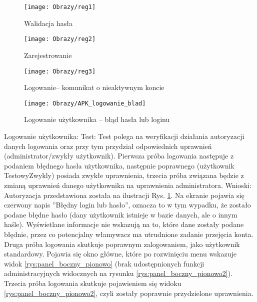\documentclass[twoside,10pt]{article}
\begin{document}
\begin{enumerate*}
\begin{figure}[ht!]
\centering
\begin{minipage}{0.3\textwidth}
\texttt{[image: Obrazy/reg1]}
\caption{Walidacja hasła }
\label{rys:reg1}
\end{minipage}
\hspace{0.05\textwidth}
\begin{minipage}{0.3\textwidth}
\texttt{[image: Obrazy/reg2]}
\caption{Zarejestrowanie}
\label{rys:reg2}
\end{minipage}
\hspace{0.05\textwidth}
\begin{minipage}{0.3\textwidth}
\texttt{[image: Obrazy/reg3]}
\caption{Logowanie-- komunikat o nieaktywnym koncie}
\label{rys:reg3}
\end{minipage}
\hspace{0.05\textwidth}
\begin{minipage}{0.3\textwidth}
\texttt{[image: Obrazy/APK\_logowanie\_blad]}
\caption{Logowanie użytkownika -- błąd hasła lub loginu}
\label{rys:Logodwanie_blad_hasla}
\end{minipage}
\end{figure}
\newpage
\item Logowanie użytkownika: \newline
Test: Test polega na weryfikacji działania autoryzacji danych logowania oraz przy tym przydział odpowiednich uprawnień (administrator/zwykły użytkownik). Pierwsza próba logowania następuje z podaniem błędnego hasła użytkownika, następnie poprawnego (użytkownik TestowyZwykly) posiada zwykłe uprawnienia, trzecia próba związana będzie z zmianą uprawnień danego użytkownika na uprawnienia administratora.\newline
Wnioski: Autoryzacja przedstawiona została na ilustracji Rys. \ref{rys:Logodwanie_blad_hasla}. Na ekranie pojawia się czerwony napis ''Błędny login lub hasło'', oznacza to w tym wypadku, że zostało podane błędne hasło (dany użytkownik istnieje w bazie danych, ale o innym haśle). Wyświetlane informacje nie wskazują na to, które dane zostały podane błędnie, przez co potencjalny włamywacz ma utrudnione zadanie przejęcia konta. Druga próba logowania skutkuje poprawnym zalogowaniem, jako użytkownik standardowy. Pojawia się okno główne, które po rozwinięciu menu wskazuje widok \ref{rys:panel_boczny_pionowo} (brak udostępnionych funkcji administracyjnych widocznych na rysunku \ref{rys:panel_boczny_pionowo2}). Trzecia próba logowania skutkuje pojawieniem się widoku \ref{rys:panel_boczny_pionowo2}, czyli zostały poprawnie przydzielone uprawnienia.


\end{enumerate*}
\end{document}
